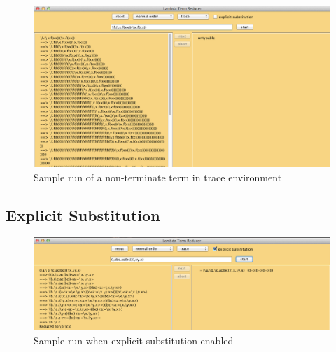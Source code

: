 \begin{figure}[ht]
\centering
\includegraphics[width=\textwidth]{pics/nonterminate}
\caption{Sample run of a non-terminate term in trace environment}
\label{fig:nt}
\end{figure}

\subsection{Explicit Substitution}

\begin{figure}[ht]
\centering
\includegraphics[width=\textwidth]{pics/explicit}
\caption{Sample run when explicit substitution enabled}
\label{fig:explicit}
\end{figure}

